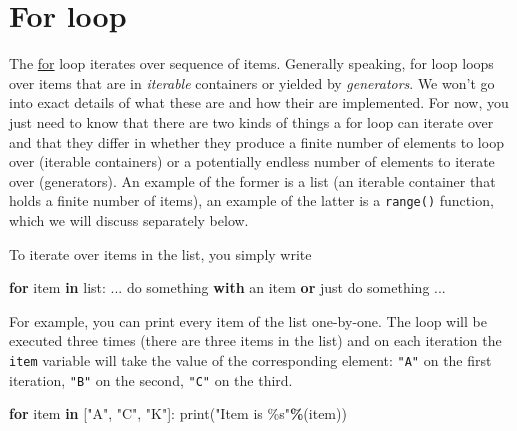 \documentclass[
]{book}
\newenvironment{Shaded}{\begin{snugshade}}{\end{snugshade}}
\newcommand{\BuiltInTok}[1]{#1}
\newcommand{\ControlFlowTok}[1]{\textcolor[rgb]{0.13,0.29,0.53}{\textbf{#1}}}
\newcommand{\KeywordTok}[1]{\textcolor[rgb]{0.13,0.29,0.53}{\textbf{#1}}}
\newcommand{\NormalTok}[1]{#1}
\newcommand{\OperatorTok}[1]{\textcolor[rgb]{0.81,0.36,0.00}{\textbf{#1}}}
\newcommand{\SpecialCharTok}[1]{\textcolor[rgb]{0.00,0.00,0.00}{#1}}
\newcommand{\StringTok}[1]{\textcolor[rgb]{0.31,0.60,0.02}{#1}}
\begin{document}
\hypertarget{for-loop}{%
\section{For loop}\label{for-loop}}

The \href{https://docs.python.org/3/tutorial/controlflow.html\#for-statements}{for} loop iterates over sequence of items. Generally speaking, for loop loops over items that are in \emph{iterable} containers or yielded by \emph{generators}. We won't go into exact details of what these are and how their are implemented. For now, you just need to know that there are two kinds of things a for loop can iterate over and that they differ in whether they produce a finite number of elements to loop over (iterable containers) or a potentially endless number of elements to iterate over (generators). An example of the former is a list (an iterable container that holds a finite number of items), an example of the latter is a \texttt{range()} function, which we will discuss separately below.

To iterate over items in the list, you simply write

\begin{Shaded}
\begin{Highlighting}[]
\ControlFlowTok{for}\NormalTok{ item }\KeywordTok{in} \BuiltInTok{list}\NormalTok{:}
\NormalTok{  ...}
\NormalTok{  do something }\ControlFlowTok{with}\NormalTok{ an item }\KeywordTok{or}\NormalTok{ just do something}
\NormalTok{  ...}
\end{Highlighting}
\end{Shaded}

For example, you can print every item of the list one-by-one. The loop will be executed three times (there are three items in the list) and on each iteration the \texttt{item} variable will take the value of the corresponding element: \texttt{"A"} on the first iteration, \texttt{"B"} on the second, \texttt{"C"} on the third.

\begin{Shaded}
\begin{Highlighting}[]
\ControlFlowTok{for}\NormalTok{ item }\KeywordTok{in}\NormalTok{ [}\StringTok{"A"}\NormalTok{, }\StringTok{"C"}\NormalTok{, }\StringTok{"K"}\NormalTok{]:}
    \BuiltInTok{print}\NormalTok{(}\StringTok{"Item is }\SpecialCharTok{\%s}\StringTok{"}\OperatorTok{\%}\NormalTok{(item))}
\end{Highlighting}
\end{Shaded}
\end{document}
